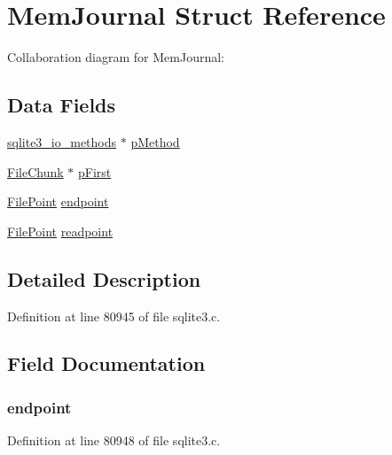 \hypertarget{struct_mem_journal}{}\section{Mem\+Journal Struct Reference}
\label{struct_mem_journal}


Collaboration diagram for Mem\+Journal\+:
\subsection*{Data Fields}
\begin{DoxyCompactItemize}
\item 
\hyperlink{structsqlite3__io__methods}{sqlite3\+\_\+io\+\_\+methods} $\ast$ \hyperlink{struct_mem_journal_ae69648ff38966fe9e4e9b75fe8d460bd}{p\+Method}
\item 
\hyperlink{struct_file_chunk}{File\+Chunk} $\ast$ \hyperlink{struct_mem_journal_a29d3dfeda536231e3b11189539617cb0}{p\+First}
\item 
\hyperlink{struct_file_point}{File\+Point} \hyperlink{struct_mem_journal_a3c38a239e2e74b37ad14fdc68f7b3294}{endpoint}
\item 
\hyperlink{struct_file_point}{File\+Point} \hyperlink{struct_mem_journal_a04600dbe595653d0f08e0ef0e64fdc64}{readpoint}
\end{DoxyCompactItemize}


\subsection{Detailed Description}


Definition at line 80945 of file sqlite3.\+c.



\subsection{Field Documentation}
\hypertarget{struct_mem_journal_a3c38a239e2e74b37ad14fdc68f7b3294}{}
\subsubsection[{endpoint}]{ endpoint}\label{struct_mem_journal_a3c38a239e2e74b37ad14fdc68f7b3294}


Definition at line 80948 of file sqlite3.\+c.

